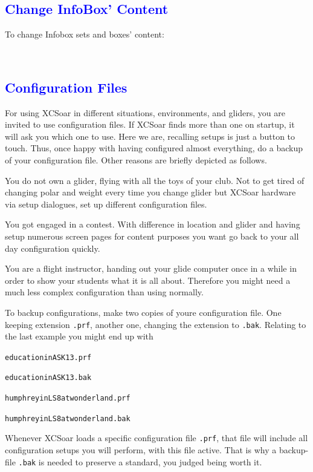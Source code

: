 \subsection*{\textcolor{blue}{Change InfoBox' Content}}
To change Infobox sets and boxes' content:
\begin{flushleft}\hspace*{1cm}\sk\blink{}\blink{}\\\end{flushleft}

\subsection*{\textcolor{blue}{Configuration Files}}
For using XCSoar in different situations, environments, and gliders, you are 
invited to use configuration files. If XCSoar finds more than one on startup, 
it will ask you which one to use. Here we are, recalling setups is just a 
button to touch.
Thus, once happy with having configured almost everything, do a backup of your 
configuration file. Other reasons are briefly depicted as follows.
\begin{compactitem}
\item You do not own a glider, flying with all the toys of your club. Not to 
get tired of changing polar and weight every time you change glider but XCSoar 
hardware via setup dialogues, set up different configuration files.
\item You got engaged in a contest. With difference in location and glider and 
having setup numerous screen pages for content purposes you want go back to 
your all day configuration quickly.
\item You are a flight instructor, handing out your glide computer once in a 
while in order to show your students what it is all about. Therefore you might 
need a much less complex configuration than using normally.
\end{compactitem}
To backup configurations, make two copies of youre configuration file.  One 
keeping extension \verb+.prf+, another one, changing the extension to
\verb+.bak+. Relating to the last example you might end up with
\begin{compactitem}
\item\verb+educationinASK13.prf+
\item\verb+educationinASK13.bak+
\item\verb+humphreyinLS8atwonderland.prf+
\item\verb+humphreyinLS8atwonderland.bak+
\end{compactitem}
Whenever XCSoar loads a specific configuration file \verb+.prf+, that file 
will include all configuration setups you will perform, with this file active. 
That is why a backup-file \verb+.bak+ is needed to preserve a standard, you 
judged being worth it.

